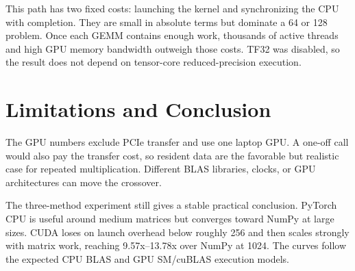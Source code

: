 \documentclass{article}
\begin{document}
This path has two fixed costs: launching the kernel and synchronizing the CPU
with completion. They are small in absolute terms but dominate a 64 or 128
problem. Once each GEMM contains enough work, thousands of active threads and
high GPU memory bandwidth outweigh those costs. TF32 was disabled, so the
result does not depend on tensor-core reduced-precision execution.

\section{Limitations and Conclusion}\label{sec:conclusion}

The GPU numbers exclude PCIe transfer and use one laptop GPU. A one-off call
would also pay the transfer cost, so resident data are the favorable but
realistic case for repeated multiplication. Different BLAS libraries, clocks,
or GPU architectures can move the crossover.

The three-method experiment still gives a stable practical conclusion.
PyTorch CPU is useful around medium matrices but converges toward NumPy at
large sizes. CUDA loses on launch overhead below roughly 256 and then scales
strongly with matrix work, reaching 9.57x--13.78x over NumPy at 1024. The
curves follow the expected CPU BLAS and GPU SM/cuBLAS execution models.

\begingroup
\small
\setlength{\bibsep}{2pt}


\endgroup
\end{document}
